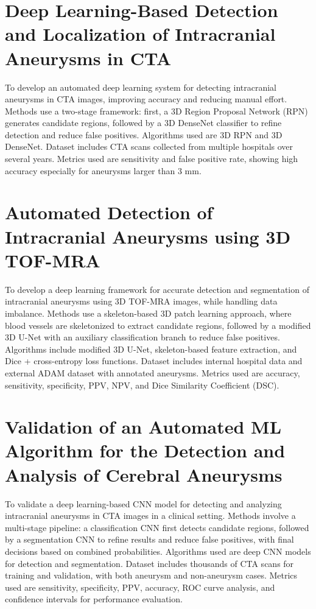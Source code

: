 \documentclass[twoside,a4paper,openright]{report} %
\begin{document}
\section{\textbf{Deep Learning-Based Detection and Localization of Intracranial Aneurysms in CTA}}
\sloppy
To develop an automated deep learning system for detecting intracranial aneurysms in CTA images, improving accuracy and reducing manual effort. Methods use a two-stage framework: first, a 3D Region Proposal Network (RPN) generates candidate regions, followed by a 3D DenseNet classifier to refine detection and reduce false positives. Algorithms used are 3D RPN and 3D DenseNet. Dataset includes CTA scans collected from multiple hospitals over several years. Metrics used are sensitivity and false positive rate, showing high accuracy especially for aneurysms larger than 3 mm.

\section{\textbf{Automated Detection of Intracranial Aneurysms using 3D TOF-MRA}}
\sloppy
To develop a deep learning framework for accurate detection and segmentation of intracranial aneurysms using 3D TOF-MRA images, while handling data imbalance. Methods use a skeleton-based 3D patch learning approach, where blood vessels are skeletonized to extract candidate regions, followed by a modified 3D U-Net with an auxiliary classification branch to reduce false positives. Algorithms include modified 3D U-Net, skeleton-based feature extraction, and Dice + cross-entropy loss functions. Dataset includes internal hospital data and external ADAM dataset with annotated aneurysms. Metrics used are accuracy, sensitivity, specificity, PPV, NPV, and Dice Similarity Coefficient (DSC).

\section{\textbf{Validation of an Automated ML Algorithm for the Detection and Analysis of Cerebral Aneurysms}}
\sloppy
To validate a deep learning-based CNN model for detecting and analyzing intracranial aneurysms in CTA images in a clinical setting. Methods involve a multi-stage pipeline: a classification CNN first detects candidate regions, followed by a segmentation CNN to refine results and reduce false positives, with final decisions based on combined probabilities. Algorithms used are deep CNN models for detection and segmentation. Dataset includes thousands of CTA scans for training and validation, with both aneurysm and non-aneurysm cases. Metrics used are sensitivity, specificity, PPV, accuracy, ROC curve analysis, and confidence intervals for performance evaluation.
\end{document}
